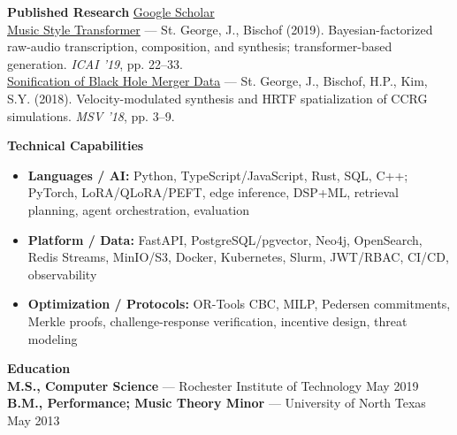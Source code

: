 \documentclass[10.5pt]{res}
\begin{document}
\begin{resume}
{\bf Published Research} \hfill \href{https://scholar.google.com/citations?user=vqdQ7YwAAAAJ\&hl=en}{Google Scholar}\\
\href{https://scholar.google.com/citations?view_op=view_citation\&hl=en\&user=vqdQ7YwAAAAJ\&citation_for_view=vqdQ7YwAAAAJ:u5HHmVD_uO8C}{Music Style Transformer} --- St. George, J., Bischof (2019). Bayesian-factorized raw-audio transcription, composition, and synthesis; transformer-based generation. \textit{ICAI '19}, pp. 22--33.\\[0.08cm]
\href{https://scholar.google.com/citations?view_op=view_citation\&hl=en\&user=vqdQ7YwAAAAJ\&citation_for_view=vqdQ7YwAAAAJ:u-x6o8ySG0sC}{Sonification of Black Hole Merger Data} --- St. George, J., Bischof, H.P., Kim, S.Y. (2018). Velocity-modulated synthesis and HRTF spatialization of CCRG simulations. \textit{MSV '18}, pp. 3--9.
\vspace{.16 cm}

{\bf Technical Capabilities}\\
\begin{itemize}[itemsep=1pt,topsep=2pt]
    \item \textbf{Languages / AI:} Python, TypeScript/JavaScript, Rust, SQL, C++; PyTorch, LoRA/QLoRA/PEFT, edge inference, DSP+ML, retrieval planning, agent orchestration, evaluation
    \item \textbf{Platform / Data:} FastAPI, PostgreSQL/pgvector, Neo4j, OpenSearch, Redis Streams, MinIO/S3, Docker, Kubernetes, Slurm, JWT/RBAC, CI/CD, observability
    \item \textbf{Optimization / Protocols:} OR-Tools CBC, MILP, Pedersen commitments, Merkle proofs, challenge-response verification, incentive design, threat modeling
\end{itemize}

{\bf Education} \\
\textbf{M.S., Computer Science} --- Rochester Institute of Technology \hfill May 2019\\[0.08cm]
\textbf{B.M., Performance; Music Theory Minor} --- University of North Texas \hfill May 2013
\end{resume}
\end{document}
